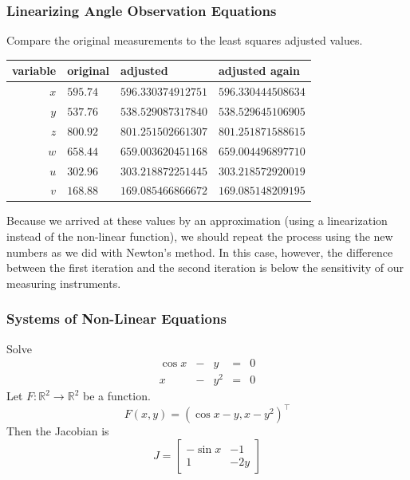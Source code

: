 \documentclass[xcolor=dvipsnames]{beamer}
\begin{document}
\begin{frame}
  \frametitle{Linearizing Angle Observation Equations}
Compare the original measurements to the least squares adjusted
values.

\bigskip

\begin{tabular}{r|l|l|l}
variable & original & adjusted & adjusted again \\ \hline
      $x$ & $595.74$  & $596.330374912751$ & $596.330444508634$ \\ 
      $y$ & $537.76$  & $538.529087317840$ & $538.529645106905$ \\ 
      $z$ & $800.92$  & $801.251502661307$ & $801.251871588615$ \\ 
      $w$ & $658.44$  & $659.003620451168$ & $659.004496897710$ \\ 
      $u$ & $302.96$  & $303.218872251445$ & $303.218572920019$ \\ 
      $v$ & $168.88$  & $169.085466866672$ & $169.085148209195$
\end{tabular}

\bigskip

Because we arrived at these values by an approximation (using a
linearization instead of the non-linear function), we should
repeat the process using the new numbers as we did with Newton's
method. In this case, however, the difference between the first
iteration and the second iteration is below the sensitivity of our
measuring instruments.
\end{frame}

\begin{frame}
  \frametitle{Systems of Non-Linear Equations}
  Solve
  \begin{equation}
    \label{eq:gieghaik}
    \begin{array}{ccccc}
      \cos{}x&-&y&=&0 \\
             x&-&y^{2}&=&0
    \end{array}
  \end{equation}
Let $F:\mathbb{R}^{2}\rightarrow\mathbb{R}^{2}$ be a function.
  \begin{equation}
    \label{eq:cohkacho}
   F(x,y)=\left(\cos{}x-y,x-y^{2}\right)^{\intercal}
  \end{equation}
  Then the Jacobian is
  \begin{equation}
    \label{eq:saimalei}
    J=\left[
      \begin{array}{cc}
        -\sin{}x & -1 \\
                 1&-2y
      \end{array}\right]
  \end{equation}
\end{frame}
\end{document}
